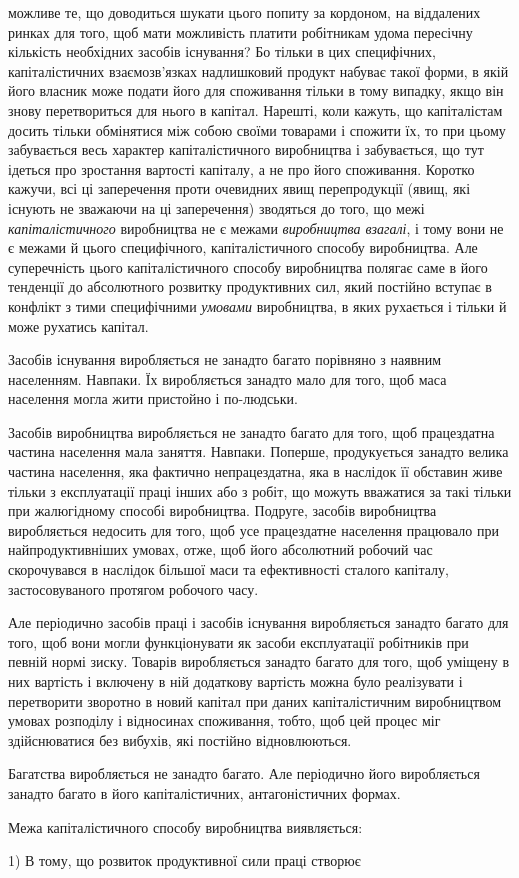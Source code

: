 \parcont{}  %
можливе те, що доводиться шукати цього попиту за кордоном, на
віддалених ринках для того, щоб мати можливість платити робітникам
удома пересічну кількість необхідних засобів існування? Бо
тільки в цих специфічних, капіталістичних взаємозв’язках надлишковий
продукт набуває такої форми, в якій його власник
може подати його для споживання тільки в тому випадку, якщо
він знову перетвориться для нього в капітал. Нарешті, коли
кажуть, що капіталістам досить тільки обмінятися між собою
своїми товарами і спожити їх, то при цьому забувається весь
характер капіталістичного виробництва і забувається, що тут
ідеться про зростання вартості капіталу, а не про його споживання.
Коротко кажучи, всі ці заперечення проти очевидних явищ
перепродукції (явищ, які існують не зважаючи на ці заперечення)
зводяться до того, що межі \emph{капіталістичного} виробництва не
є межами \emph{виробництва взагалі}, і тому вони не є межами й цього
специфічного, капіталістичного способу виробництва. Але суперечність
цього капіталістичного способу виробництва полягає
саме в його тенденції до абсолютного розвитку продуктивних сил,
який постійно вступає в конфлікт з тими специфічними \emph{умовами}
виробництва, в яких рухається і тільки й може рухатись капітал.

Засобів існування виробляється не занадто багато порівняно
з наявним населенням. Навпаки. Їх виробляється занадто мало
для того, щоб маса населення могла жити пристойно і по-людськи.

Засобів виробництва виробляється не занадто багато для
того, щоб працездатна частина населення мала заняття. Навпаки.
Поперше, продукується занадто велика частина населення, яка
фактично непрацездатна, яка в наслідок її обставин живе тільки
з експлуатації праці інших або з робіт, що можуть вважатися
за такі тільки при жалюгідному способі виробництва. Подруге,
засобів виробництва виробляється недосить для того, щоб усе
працездатне населення працювало при найпродуктивніших умовах,
отже, щоб його абсолютний робочий час скорочувався
в наслідок більшої маси та ефективності сталого капіталу, застосовуваного
протягом робочого часу.

Але періодично засобів праці і засобів існування виробляється
занадто багато для того, щоб вони могли функціонувати
як засоби експлуатації робітників при певній нормі зиску. Товарів
виробляється занадто багато для того, щоб уміщену в них
вартість і включену в ній додаткову вартість можна було реалізувати
і перетворити зворотно в новий капітал при даних капіталістичним
виробництвом умовах розподілу і відносинах споживання,
тобто, щоб цей процес міг здійснюватися без вибухів,
які постійно відновлюються.

Багатства виробляється не занадто багато. Але періодично
його виробляється занадто багато в його капіталістичних, антагоністичних
формах.

Межа капіталістичного способу виробництва виявляється:

1) В тому, що розвиток продуктивної сили праці створює
\parbreak{}  %
